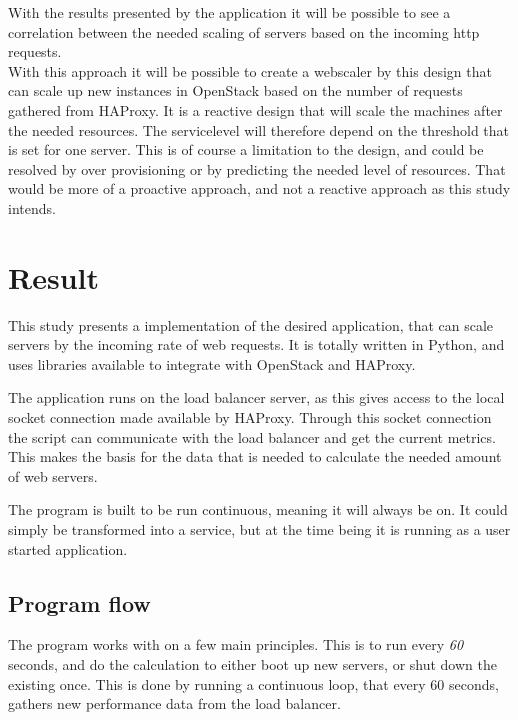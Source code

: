 

With the results presented by the application it will be possible to see a
correlation between the needed scaling of servers based on the incoming http
requests.\\

With this approach it will be possible to create a webscaler by this design
that can scale up new instances in OpenStack based on the number of requests
gathered from HAProxy. It is a reactive design that will scale the machines
after the needed resources. The servicelevel will therefore depend on the
threshold that is set for one server. This is of course a limitation to the
design, and could be resolved by over provisioning or by predicting the needed
level of resources. That would be more of a proactive approach, and not a
reactive approach as this study intends.

\section{Result}
This study presents a implementation of the desired application, that can scale
servers by the incoming rate of web requests. It is totally written in Python,
and uses libraries available to integrate with OpenStack and HAProxy.

The application runs on the load balancer server, as this gives access to the
local socket connection made available by HAProxy. Through this socket
connection the script can communicate with the load balancer and get the
current metrics. This makes the basis for the data that is needed to calculate
the needed amount of web servers.

The program is built to be run continuous, meaning it will always be on. It
could simply be transformed into a service, but at the time being it is
running as a user started application. 

\subsection{Program flow}
The program works with on a few main principles. This is to run every
\textit{60} seconds, and do the calculation to either boot up new servers, or
shut down the existing once. This is done by running a continuous loop, that
every 60 seconds, gathers new performance data from the load balancer. 

